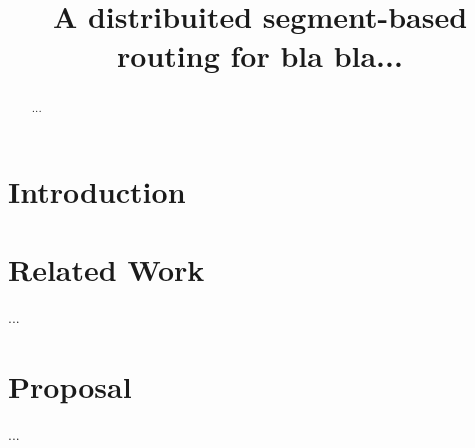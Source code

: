 \documentclass[conference]{IEEEtran}
\begin{document}

\title{A distribuited segment-based routing for bla bla...} 

\author{  \and
    \and
   }

\maketitle


\begin{abstract}
  ...
\end{abstract}




\section{Introduction}



\section{Related Work}
...


\section{Proposal}
...
\end{document}
